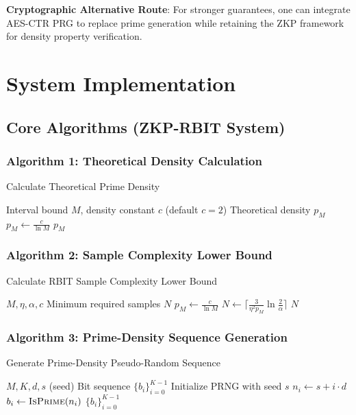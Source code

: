 \documentclass[12pt]{article}
\theoremstyle{plain}
\theoremstyle{definition}
\begin{document}
\textbf{Cryptographic Alternative Route}: For stronger guarantees, one can integrate AES-CTR PRG to replace prime generation while retaining the ZKP framework for density property verification.

\section{System Implementation}

\subsection{Core Algorithms (ZKP-RBIT System)}

\subsubsection{Algorithm 1: Theoretical Density Calculation}

\begin{algorithm}
\caption{Calculate Theoretical Prime Density}
\begin{algorithmic}[1]
\REQUIRE Interval bound $M$, density constant $c$ (default $c=2$)
\ENSURE Theoretical density $p_M$
\STATE $p_M \leftarrow \frac{c}{\ln M}$
\RETURN $p_M$
\end{algorithmic}
\end{algorithm}

\subsubsection{Algorithm 2: Sample Complexity Lower Bound}

\begin{algorithm}
\caption{Calculate RBIT Sample Complexity Lower Bound}
\begin{algorithmic}[1]
\REQUIRE $M, \eta, \alpha, c$
\ENSURE Minimum required samples $N$
\STATE $p_M \leftarrow \frac{c}{\ln M}$
\STATE $N \leftarrow \lceil \frac{3}{\eta^2 p_M} \ln \frac{2}{\alpha} \rceil$
\RETURN $N$
\end{algorithmic}
\end{algorithm}

\subsubsection{Algorithm 3: Prime-Density Sequence Generation}

\begin{algorithm}
\caption{Generate Prime-Density Pseudo-Random Sequence}
\begin{algorithmic}[1]
\REQUIRE $M, K, d, s$ (seed)
\ENSURE Bit sequence $\{b_i\}_{i=0}^{K-1}$
\STATE Initialize PRNG with seed $s$
    \STATE $n_i \leftarrow s + i \cdot d$ 
    \STATE $b_i \leftarrow \textsc{IsPrime}(n_i)$ 
\ENDFOR
\RETURN $\{b_i\}_{i=0}^{K-1}$
\end{algorithmic}
\end{algorithm}
\end{document}
